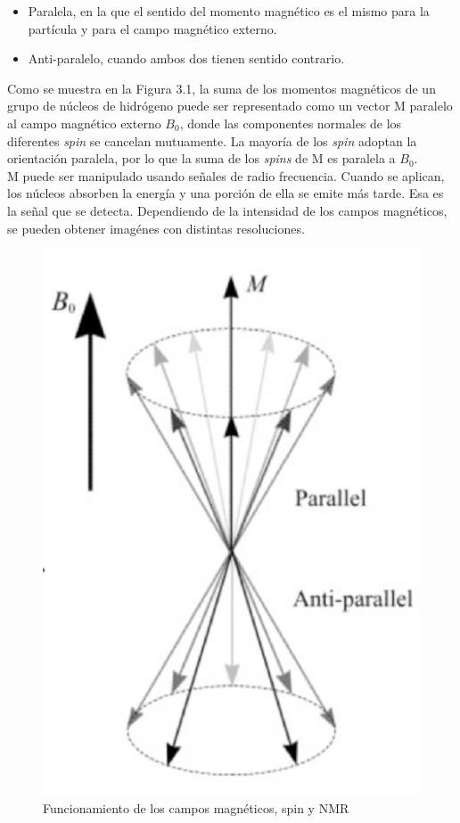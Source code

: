 \begin{itemize}
	\item Paralela, en la que el sentido del momento magnético es el mismo para la partícula y para el campo magnético externo.
	\item Anti-paralelo, cuando ambos dos tienen sentido contrario.
\end{itemize}

Como se muestra en la Figura 3.1, la suma de los momentos magnéticos de un grupo de núcleos de hidrógeno puede ser representado como un vector M paralelo al campo magnético externo $B_0$, donde las componentes normales de los diferentes \textit{spin} se cancelan mutuamente. La mayoría de los \textit{spin} adoptan la orientación paralela, por lo que la suma de los \textit{spins} de M es paralela a $B_0$. \\

M puede ser manipulado usando señales de radio frecuencia. Cuando se aplican, los núcleos absorben la energía y una porción de ella se emite más tarde. Esa es la señal que se detecta. Dependiendo de la intensidad de los campos magnéticos, se pueden obtener imagénes con distintas resoluciones.

 \begin{figure}[H] %
 	\centering
 	\includegraphics[scale=0.34]{nmr.png}  %
 	\caption{Funcionamiento de los campos magnéticos, spin y NMR} 
 	\label{fig:nmr}
 \end{figure}

